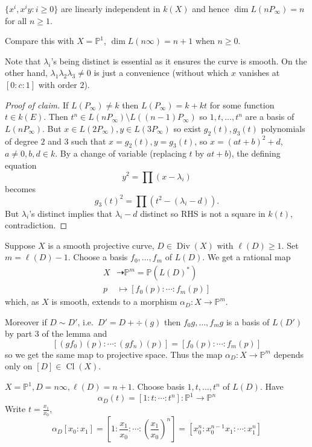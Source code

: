 \documentclass[a4paper]{article}
\DeclareMathOperator{\Cl}{Cl}
\renewcommand*{\P}{\mathbb{P}}
\newcommand{\rational}{\dashrightarrow} %
\DeclareMathOperator{\Div}{Div} %
\begin{document}
\begin{eg}
  \begin{ex}
    \(\{x^i, x^iy: i \geq 0\}\) are linearly independent in \(k(X)\) and hence \(\dim L(n P_\infty) = n\) for all \(n \geq 1\).
  \end{ex}

  Compare this with \(X = \P^1\), \(\dim L(n \infty) = n + 1\) when \(n \geq 0\).

  Note that \(\lambda_i\)'s being distinct is essential as it ensures the curve is smooth. On the other hand, \(\lambda_1\lambda_2\lambda_3 \neq 0\) is just a convenience (without which \(x\) vanishes at \([0:c:1]\) with order \(2\)).

  \begin{proof}[Proof of claim]
    If \(L(P_\infty) \neq k\) then \(L(P_\infty) = k + kt\) for some function \(t \in k(E)\). Then \(t^n \in L(n P_\infty) \setminus L((n - 1) P_\infty)\) so \(1, t, \dots, t^n\) are a basis of \(L(n P_\infty)\). But \(x \in L(2 P_\infty), y \in L(3P_\infty)\) so exist \(g_2(t), g_3(t)\) polynomials of degree \(2\) and \(3\) such that \(x = g_2(t), y = g_3(t)\), so \(x = (a t + b)^2 + d\), \(a \neq 0, b, d \in k\). By a change of variable (replacing \(t\) by \(a t + b\)), the defining equation
    \[
      y^2 = \prod (x - \lambda_i)
    \]
    becomes
    \[
      g_3(t)^2 = \prod (t^2 - (\lambda_i - d)).
    \]
    But \(\lambda_i\)'s distinct implies that \(\lambda_i - d\) distinct so RHS is not a square in \(k(t)\), contradiction.
  \end{proof}
\end{eg}

Suppose \(X\) is a smooth projective curve, \(D \in \Div (X)\) with \(\ell(D) \geq 1\). Set \(m = \ell(D) - 1\). Choose a basis \(f_0, \dots, f_m\) of \(L(D)\). We get a rational map
\begin{align*}
  X &\rational \P^m = \P(L(D)^*) \\
  p &\mapsto [f_0(p): \cdots : f_m(p)]
\end{align*}
which, as \(X\) is smooth, extends to a morphism \(\alpha_D: X \to \P^m\).

Moreover if \(D \sim D'\), i.e.\ \(D' = D + \div (g)\) then \(f_0g, \dots, f_mg\) is a basis of \(L(D')\) by part 3 of the lemma and
\[
  [(gf_0)(p) : \cdots : (gf_n)(p)] = [f_0(p): \cdots: f_m(p)]
\]
so we get the same map to projective space. Thus the map \(\alpha_D: X \to \P^m\) depends only on \([D] \in \Cl(X)\).

\begin{eg}
  \(X = \P^1, D = n \infty, \ell(D) = n + 1\). Choose basis \(1, t, \dots, t^n\) of \(L(D)\). Have
  \[
    \alpha_D(t) = [1: t: \cdots :t^n]: \P^1 \to \P^n
  \]
  Write \(t = \frac{x_1}{x_0}\),
  \[
    \alpha_D[x_0: x_1] = [1: \frac{x_1}{x_0}: \cdots : \left( \frac{x_1}{x_0} \right)^n] = [x_0^n:x_0^{n - 1} x_1: \cdots : x_1^n]
  \]
\end{eg}
\end{document}
